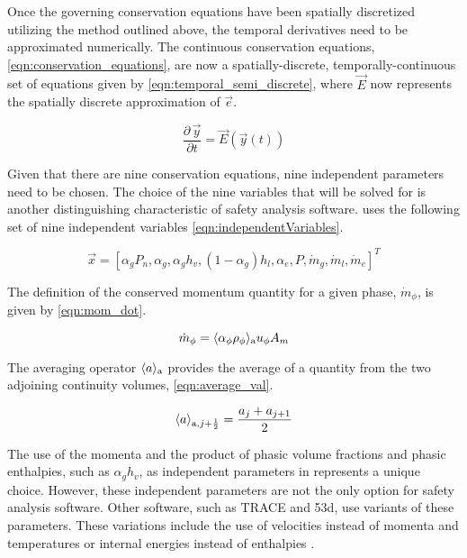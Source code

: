 Once the governing conservation equations have been spatially discretized utilizing the method outlined above, the temporal derivatives need to be approximated numerically.
The continuous conservation equations, \eqref{eqn:conservation_equations}, are now a spatially-discrete, temporally-continuous set of equations given by \eqref{eqn:temporal_semi_discrete}, where $\vec{E}$ now represents the spatially discrete approximation of $\vec{e}$.

\begin{equation}
\label{eqn:temporal_semi_discrete}
\frac{\partial \,\vec{y} }{\partial t} = \vec{E}(\vec{y}(t))
\end{equation}

Given that there are nine conservation equations, nine independent parameters need to be chosen.
The choice of the nine variables that will be solved for is another distinguishing characteristic of safety analysis software.
\cobra{} uses the following set of nine independent variables \eqref{eqn:independentVariables}.

\begin{equation}
\label{eqn:independentVariables}
\vec{x} = [\alpha_{g}P_{n}, \alpha_g, \alpha_g h_v, (1 - \alpha_g) h_l, \alpha_e, P, \dot{m}_g, \dot{m}_l, \dot{m}_e]^{T}
\end{equation}

The definition of the conserved momentum quantity for a given phase, $\dot{m}_{\phi}$, is given by \eqref{eqn:mom_dot}.

\begin{equation}
\label{eqn:mom_dot}
\dot{m}_{\phi} = \ave{\alpha_{\phi} \rho_{\phi}}_{\text{a}} u_{\phi} A_{m}
\end{equation}

The averaging operator $\ave{a}_{\text{a}}$ provides the average of a quantity from the two adjoining continuity volumes, \eqref{eqn:average_val}.

\begin{equation}
\label{eqn:average_val}
\ave{a}_{\text{a},j + \onehalf} = \frac{a_{j} + a_{j+1}}{2}
\end{equation}

The use of the momenta and the product of phasic volume fractions and phasic enthalpies, such as $\alpha_g h_v$, as independent parameters in \cobra{} represents a unique choice.
However, these independent parameters are not the only option for safety analysis software.
Other software, such as TRACE and \relap53d{}, use variants of these parameters.
These variations include the use of velocities instead of momenta and temperatures or internal energies instead of enthalpies \cite{RELAP, TRACE}.


